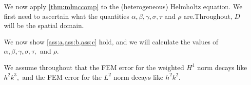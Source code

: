 We now apply \cref{thm:mlmccomp} to the (heterogeneous) Helmholtz equation. We first need to ascertain what the quantities $\alpha, \beta, \gamma, \sigma, \tau$ and $\rho$ are.Throughout, $D$ will be the spatial domain.

%
%
%
%

We now show \cref{ass:a,ass:b,ass:c} hold, and we will calculate the values of $\alpha, \beta, \gamma, \sigma, \tau,$ and $\rho$.

We assume throughout that the FEM error for the weighted $H^1$ norm decays like $h^2k^3,$ and the FEM error for the $L^2$ norm decays like $h^2k^2.$

